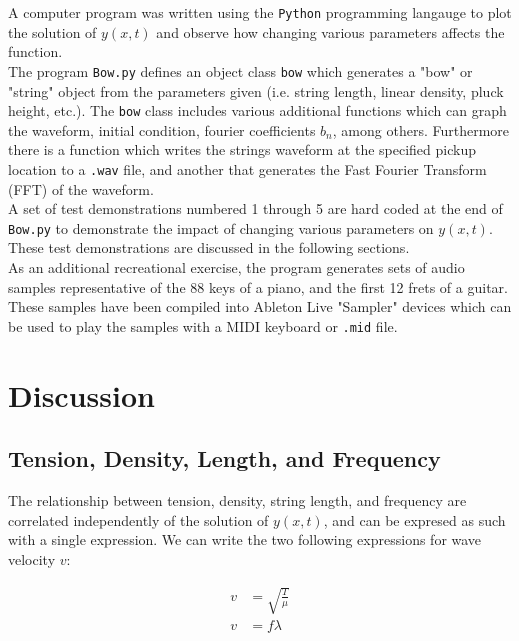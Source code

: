 \documentclass[%
 reprint,
 amsmath,amssymb,
 aps,
]{revtex4-1}
\begin{document}
A computer program was written using the \texttt{Python} programming langauge to plot the solution of $y(x,t)$ and observe how changing various parameters affects the function.\\

The program \texttt{Bow.py} defines an object class \texttt{bow} which generates a "bow" or "string" object from the parameters given (i.e. string length, linear density, pluck height, etc.). The \texttt{bow} class includes various additional functions which can graph the waveform, initial condition, fourier coefficients $b_n$, among others. Furthermore there is a function which writes the strings waveform at the specified pickup location to a \texttt{.wav} file, and another that generates the Fast Fourier Transform (FFT) of the waveform. \\

A set of test demonstrations numbered 1 through 5 are hard coded at the end of \texttt{Bow.py} to demonstrate the impact of changing various parameters on $y(x,t)$. These test demonstrations are discussed in the following sections.\\ 

As an additional recreational exercise, the program generates sets of audio samples representative of the 88 keys of a piano, and the first 12 frets of a guitar. These samples have been compiled into Ableton Live "Sampler" devices which can be used to play the samples with a MIDI keyboard or \texttt{.mid} file.\\

\section{\label{sec:level1}Discussion}



\subsection{\label{sec:level1}Tension, Density, Length, and Frequency}
The relationship between tension, density, string length, and frequency are correlated independently of the solution of $y(x,t)$, and can be expresed as such with a single expression. We can write the two following expressions for wave velocity $v$:

\begin{align}
v &= \sqrt{\frac{T}{\mu}}\\
v &= f \lambda
\end{align}
\end{document}
